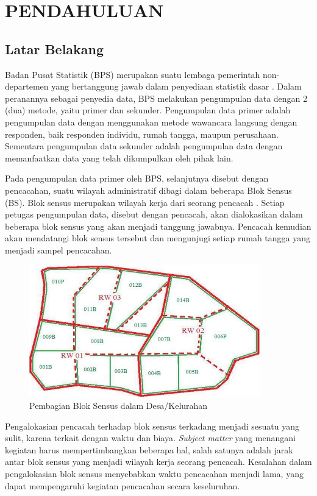 \chapter{PENDAHULUAN} \label{ch:chapter_1}

\section{Latar Belakang}

Badan Pusat Statistik (BPS) merupakan suatu lembaga pemerintah non-departemen yang bertanggung jawab dalam penyediaan statistik dasar \citep{bps_badan_2016}. Dalam peranannya sebagai penyedia data, BPS melakukan pengumpulan data dengan 2 (dua) metode, yaitu primer dan sekunder. Pengumpulan data primer adalah pengumpulan data dengan menggunakan metode wawancara langsung dengan responden, baik responden individu, rumah tangga, maupun perusahaan. Sementara pengumpulan data sekunder adalah pengumpulan data dengan memanfaatkan data yang telah dikumpulkan oleh pihak lain.


Pada pengumpulan data primer oleh BPS, selanjutnya disebut dengan pencacahan, suatu wilayah administratif dibagi dalam beberapa Blok Sensus (BS). Blok sensus merupakan wilayah kerja dari seorang pencacah \citep{bps_sistem_2016}. Setiap petugas pengumpulan data, disebut dengan pencacah, akan dialokasikan dalam beberapa blok sensus yang akan menjadi tanggung jawabnya. Pencacah kemudian akan mendatangi blok sensus tersebut dan mengunjugi setiap rumah tangga yang menjadi sampel pencacahan.


\begin{figure}[h]
    \centering
    \includegraphics[width=10cm]{../../Resources/Images/peta_kelurahan_per_bs}
    \caption{Pembagian Blok Sensus dalam Desa/Kelurahan}
    \label{fig:capi-ilustration}
\end{figure}


Pengalokasian pencacah terhadap blok sensus terkadang menjadi sesuatu yang sulit, karena terkait dengan waktu dan biaya. \textit{Subject matter} yang menangani kegiatan harus mempertimbangkan beberapa hal, salah satunya adalah jarak antar blok sensus yang menjadi wilayah kerja seorang pencacah. Kesalahan dalam pengalokasian blok sensus menyebabkan waktu pencacahan menjadi lama, yang dapat mempengaruhi kegiatan pencacahan secara keseluruhan.


